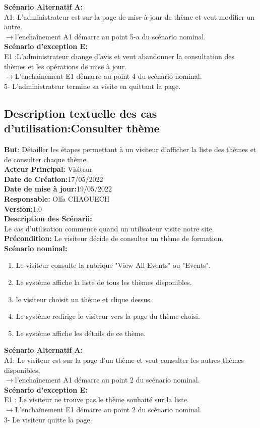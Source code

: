\textbf{Scénario Alternatif A:} \\
A1: L'administrateur est sur la page de mise à jour de thème et veut modifier un autre.\\ 	$\rightarrow$l'enchaînement A1 démarre au point 5-a du scénario nominal.\\
\textbf{Scénario d'exception E:}\\
E1 :L'administrateur change d'avis et veut abandonner la consultation des thèmes et les opérations de mise à jour.\\
	$\rightarrow$L'enchaînement E1 démarre au point 4 du scénario nominal.\\
5- L'administrateur termine sa visite en quittant la page.

\subsection{Description textuelle des cas d’utilisation:Consulter thème}
\textbf{But}: Détailler les étapes permettant à un visiteur d'afficher la liste des thèmes et de consulter chaque thème.\\
\textbf{Acteur Principal:} Visiteur \\
\textbf{Date de Création:}17/05/2022\\
\textbf{Date de mise à jour:}19/05/2022\\
\textbf{Responsable:} Olfa CHAOUECH\\
\textbf{Version:}1.0\\
\textbf{Description des Scénarii:}\\
Le cas d'utilisation commence quand un utilisateur visite notre site.\\
\textbf{Précondition:} Le visiteur décide de consulter un thème de formation.\\
\textbf{Scénario nominal:}
\begin{enumerate}
	\item Le visiteur consulte la rubrique "View All Events" ou "Events".
	\item Le système affiche la liste de tous les thèmes disponibles.
	\item le visiteur choisit un thème et clique dessus.
	\item Le système redirige le visiteur vers la page du thème choisi.
	\item Le système affiche les détails de ce thème.
	
\end{enumerate}
\textbf{Scénario Alternatif A:} \\
A1: Le visiteur est sur la page d'un thème et veut consulter les autres thèmes disponibles,\\ 	$\rightarrow$l'enchaînement A1 démarre au point 2 du scénario nominal.\\
\textbf{Scénario d'exception E:}\\
E1 : Le visiteur ne trouve pas le thème souhaité sur la liste.\\
	$\rightarrow$L'enchaînement E1 démarre au point 2 du scénario nominal.\\
3- Le visiteur quitte la page.

